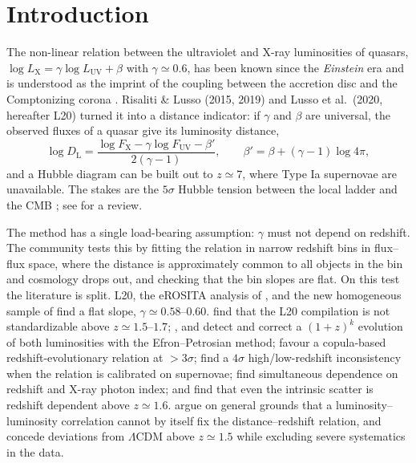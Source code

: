 \documentclass[twocolumn,10pt]{article}
\newcommand{\LX}{L_{\mathrm{X}}}
\newcommand{\LUV}{L_{\mathrm{UV}}}
\newcommand{\FX}{F_{\mathrm{X}}}
\newcommand{\FUV}{F_{\mathrm{UV}}}
\newcommand{\DL}{D_{\mathrm{L}}}
\begin{document}
\section{Introduction}
The non-linear relation between the ultraviolet and X-ray luminosities of quasars, $\log\LX=\gamma\log\LUV+\beta$ with $\gamma\simeq0.6$, has been known since the \textit{Einstein} era \citep{tananbaum79,avni86} and is understood as the imprint of the coupling between the accretion disc and the Comptonizing corona \citep{haardt91,lusso17,kubota18}. Risaliti \& Lusso (2015, 2019) and Lusso et al.\ (2020, hereafter L20) turned it into a distance indicator: if $\gamma$ and $\beta$ are universal, the observed fluxes of a quasar give its luminosity distance,
\begin{equation}
\log\DL=\frac{\log\FX-\gamma\log\FUV-\beta'}{2(\gamma-1)},\qquad \beta'=\beta+(\gamma-1)\log4\pi ,
\label{eq:dl}
\end{equation}
and a Hubble diagram can be built out to $z\simeq7$, where Type Ia supernovae are unavailable. The stakes are the $5\sigma$ Hubble tension between the local ladder \citep{riess22} and the CMB \citep{planck20}; see \citet{divalentino21} for a review.

The method has a single load-bearing assumption: $\gamma$ must not depend on redshift. The community tests this by fitting the relation in narrow redshift bins in flux--flux space, where the distance is approximately common to all objects in the bin and cosmology drops out, and checking that the bin slopes are flat. On this test the literature is split. L20, the eROSITA analysis of \citet{sacchi25}, and the new homogeneous sample of \citet{risaliti26} find a flat slope, $\gamma\simeq0.58$--$0.60$. \citet{khadka20,khadka21,khadka22} find that the L20 compilation is not standardizable above $z\simeq1.5$--$1.7$; \citet{dainotti22}, \citet{lenart23} and \citet{dainotti23} detect and correct a $(1+z)^k$ evolution of both luminosities with the Efron--Petrosian method; \citet{wang22,wang24} favour a copula-based redshift-evolutionary relation at $>3\sigma$; \citet{li25} find a $4\sigma$ high/low-redshift inconsistency when the relation is calibrated on supernovae; \citet{li26} find simultaneous dependence on redshift and X-ray photon index; and \citet{gao26} find that even the intrinsic scatter is redshift dependent above $z\simeq1.6$. \citet{petrosian22} argue on general grounds that a luminosity--luminosity correlation cannot by itself fix the distance--redshift relation, and \citet{lusso25} concede deviations from $\Lambda$CDM above $z\simeq1.5$ while excluding severe systematics in the data.
\end{document}

